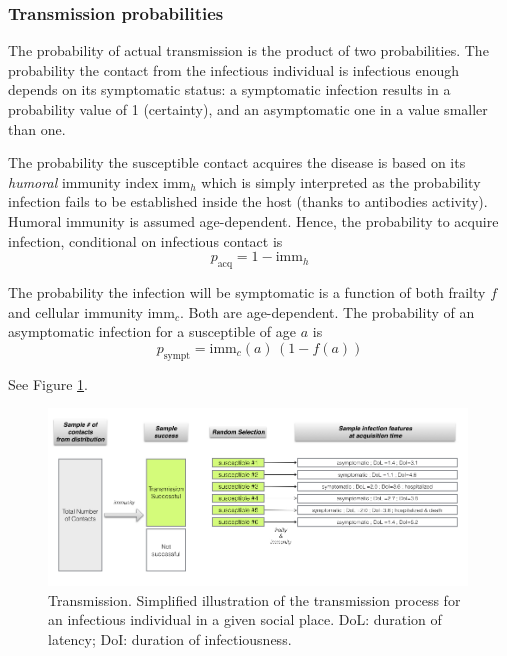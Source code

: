 \documentclass[11pt, onecolumn]{article}
\newcommand{\immh}{\ensuremath{\text{imm}_h}}
\newcommand{\immc}{\ensuremath{\text{imm}_c}}
\begin{document}
\subsubsection*{Transmission probabilities}

The probability of actual transmission is the product of two probabilities. The probability the contact from the infectious individual is infectious enough depends on its symptomatic status: a symptomatic infection results in a probability value of 1 (certainty), and an asymptomatic one in a value smaller than one. 

The probability the susceptible contact acquires the disease is based on its \emph{humoral} immunity index $\immh$ which is simply interpreted as the probability infection fails to be established inside the host (thanks to antibodies activity). Humoral immunity is assumed age-dependent. Hence, the probability to acquire infection, conditional on infectious contact is
\begin{equation}
p_{\text{acq}} = 1 - \immh
\end{equation}

The probability the infection will be symptomatic is a function of both frailty $f$ and cellular immunity \immc. Both are age-dependent. The probability of an asymptomatic infection for a susceptible of age $a$ is
\begin{equation}
p_{\text{sympt}} = \immc(a) \, (1-f(a))
\end{equation}

See Figure \ref{fig:transmission}.


\begin{figure}[!ht]
\centering
    \includegraphics[angle=0,width=0.99\textwidth]{figures/transmission.jpg}
\caption{Transmission. Simplified illustration of the transmission process for an infectious individual in a given social place. DoL: duration of latency; DoI: duration of infectiousness.}
\label{fig:transmission}
\end{figure}
\end{document}
